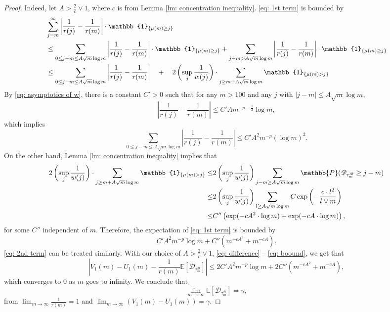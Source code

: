 \documentclass[EJP]{ejpecp} %
\newcommand{\abs}[1]{\left\vert #1 \right\vert}
\begin{document}
\begin{proof}
	Indeed, let $A> \frac{2}{c} \vee 1$, where $c$ is from Lemma \ref{lm: concentration inequality}. \eqref{eq: 1st term} is bounded by
	\begin{align*}
		& \sum_{j=m}^{\infty} \abs{\frac{1}{r(j)} -\frac{1}{r(m)} } \cdot \mathbb{1}_{\left\{\mu(m)\geq j \right\}}\\
		& \leq  \sum_{0\leq j-m \leq A \sqrt{m}\log m } \abs{\frac{1}{r(j)} -\frac{1}{r(m)} } \cdot \mathbb{1}_{\left\{\mu(m)\geq j \right\}}
		+  \sum_{j-m > A\sqrt{m}\log m } \abs{\frac{1}{r(j)} -\frac{1}{r(m)} } \cdot \mathbb{1}_{\left\{\mu(m)\geq j \right\}}
		\notag
		\\
		&\leq  \sum_{0\leq j-m \leq A\sqrt{m}\log m } \abs{\frac{1}{r(j)} -\frac{1}{r(m)} }
		\quad +\quad 2\left(\sup_j \frac{1}{w(j)}\right) \cdot \sum_{j\geq m + A\sqrt{m}\log m } \mathbb{1}_{\left\{ \mu(m) > j \right\}}
		\label{eq: low large difference}
	\end{align*}
	By \eqref{eq: asymptotics of w}, there is a constant $C'>0$ such that for any $m>100 $ and any $j$ with $\abs{j-m}\leq A \sqrt m \log m $, 
	\[ \abs{\frac{1}{r(j)} -\frac{1}{r(m)} } \leq C' A m^{-p-\frac{1}{2}} \log m, \]
	which implies
	\[
	\sum_{0\leq j-m \leq A\sqrt{m}\log m } \abs{\frac{1}{r(j)} -\frac{1}{r(m)} } \le 
	C' A^2 m^{-p} (\log m)^2.
	\] On the other hand, Lemma \ref{lm: concentration inequality} implies that
	\begin{align*}
		2\left(\sup_j \frac{1}{w(j)}\right) \cdot \sum_{j\geq m + A\sqrt{m}\log m } \mathbb{1}_{\left\{ \mu(m) > j \right\}}
		\le & 2\left(\sup_j \frac{1}{w(j)}\right) \sum_{j-m \geq A \sqrt m \log m  } \mathbb{P}( \mathscr{D}_{\tau^{\mathscr{B}}_m} \geq j-m )  
		\notag 
		\\
		\leq& 2\left(\sup_j \frac{1}{w(j)}\right) \sum_{l \geq A \sqrt m \log m } C \exp\left( - \frac{c  \cdot l^2}{l \vee m}   \right)
		\notag\\
		\leq& C'' \left( \exp (- cA^2 \cdot \log m ) + \exp(-cA \cdot \log m) \right), 
	\end{align*} for some $C''$ independent of $m$. Therefore, the expectation of \eqref{eq: 1st term} is bounded by
	\begin{equation}\label{eq: boound}
		C' A^2 m^{-p} \log m + C''  \left( m ^{-cA^2} +  m^{-cA} \right). 
	\end{equation}
	\eqref{eq: 2nd term} can be treated similarly. With our choice of $A >\frac{2}{c} \vee 1$,
	\eqref{eq: difference} -- 
	\eqref{eq: boound}, we get that
	$$ \abs{ V_1(m)- U_1(m) -\frac{1}{r(m)}\mathbb{E}\left[ \mathscr{D}_{\tau^{\mathscr{B}}_m} \right] }
	\leq 2C' A^2 m^{-p} \log m + 2C''  \left( m ^{-cA^2} +  m^{-cA} \right), 
	$$ 
	which converges to $0$ as $m$ goes to infinity. We conclude that 
	\[
	\lim_{m\to\infty}\mathbb{E}\left[ \mathscr{D}_{\tau^{\mathscr{B}}_m} \right] = \gamma, 
	\] 
	from $\lim_{m\to\infty}\frac{1}{r(m)} =1$ and $ \lim_{m\to \infty} \left(V_1(m)-U_1(m) \right) = \gamma$.
\end{proof}
\end{document}
